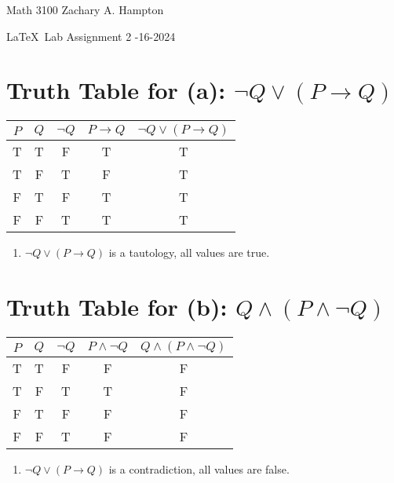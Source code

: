 \documentclass[12pt]{article}
\theoremstyle{definition}
\begin{document}
Math 3100 \hfill Zachary A. Hampton

\LaTeX~Lab Assignment 2 \hfill 
{}-16-2024

\bigskip

\section*{Truth Table for (a): $\neg Q \lor (P \rightarrow Q)$}

\begin{tabular}{|c|c|c|c|c|}
    \hline
    $P$ & $Q$ & $\neg Q$ & $P \rightarrow Q$ & $\neg Q \lor (P \rightarrow Q)$ \\
    \hline
    T & T & F & T & T \\
    T & F & T & F & T \\
    F & T & F & T & T \\
    F & F & T & T & T \\
    \hline
\end{tabular}

\begin{enumerate}

    \item $\neg Q \lor (P \rightarrow Q)$ is a tautology, all values are true.

\end{enumerate}

\vspace{1cm}

\section*{Truth Table for (b): $Q \land (P \land \neg Q)$}

\begin{tabular}{|c|c|c|c|c|}
    \hline
    $P$ & $Q$ & $\neg Q$ & $P \land \neg Q$ & $Q \land (P \land \neg Q)$ \\
    \hline
    T & T & F & F & F \\
    T & F & T & T & F \\
    F & T & F & F & F \\
    F & F & T & F & F \\
    \hline
\end{tabular}

\begin{enumerate}

    \item $\neg Q \lor (P \rightarrow Q)$ is a contradiction, all values are false.

\end{enumerate}
\end{document}
